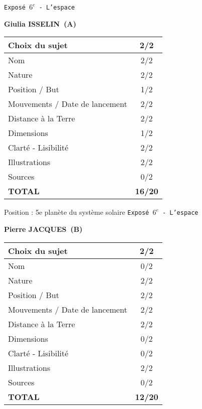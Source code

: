 	\vspace*{1cm}
	
	\newpage
	\LARGE{\texttt{Expos\'e $6^e$ - L'espace}}
	\vspace*{1cm}

	\textbf{Giulia ISSELIN\ (A)}

	\vspace*{1.5cm}
	\begin{tabular}{|l|c|}
		\hline
		Choix du sujet & 2/2 \\
		\hline
		Nom & 2/2 \\
		\hline
		Nature & 2/2 \\
		\hline
		Position / But & 1/2 \\
		\hline
		Mouvements / Date de lancement & 2/2 \\
		\hline
		Distance \`a la Terre & 2/2 \\
		\hline
		Dimensions & 1/2 \\
		\hline
		Clart\'e - Lisibilit\'e & 2/2 \\
		\hline
		Illustrations & 2/2 \\
		\hline
		Sources & 0/2 \\
		\hline
		\textbf{TOTAL}  & \textbf{16/20} \\
		\hline
	\end{tabular}

	\vspace*{1cm}
	Position : 5e plan\`ete du syst\`eme solaire
	\newpage
	\LARGE{\texttt{Expos\'e $6^e$ - L'espace}}
	\vspace*{1cm}

	\textbf{Pierre JACQUES\ (B)}

	\vspace*{1.5cm}
	\begin{tabular}{|l|c|}
		\hline
		Choix du sujet & 2/2 \\
		\hline
		Nom & 0/2 \\
		\hline
		Nature & 2/2 \\
		\hline
		Position / But & 2/2 \\
		\hline
		Mouvements / Date de lancement & 2/2 \\
		\hline
		Distance \`a la Terre & 2/2 \\
		\hline
		Dimensions & 0/2 \\
		\hline
		Clart\'e - Lisibilit\'e & 0/2 \\
		\hline
		Illustrations & 2/2 \\
		\hline
		Sources & 0/2 \\
		\hline
		\textbf{TOTAL}  & \textbf{12/20} \\
		\hline
	\end{tabular}

